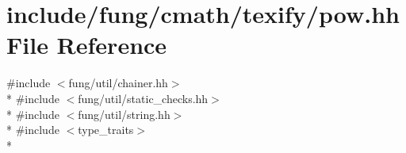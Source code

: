 \hypertarget{texify_2pow_8hh}{\section{include/fung/cmath/texify/pow.hh File Reference}
\label{texify_2pow_8hh}
}
{\ttfamily \#include $<$fung/util/chainer.\-hh$>$}\\*
{\ttfamily \#include $<$fung/util/static\-\_\-checks.\-hh$>$}\\*
{\ttfamily \#include $<$fung/util/string.\-hh$>$}\\*
{\ttfamily \#include $<$type\-\_\-traits$>$}\\*
